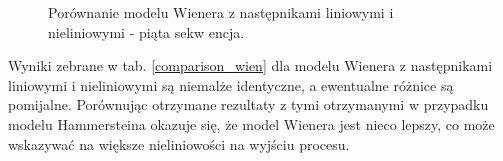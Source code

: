 \begin{figure}[p]
\centering
{}
\vspace{0.5cm}
\caption{Porównanie modelu Wienera z następnikami liniowymi i nieliniowymi - piąta sekw encja.}
\label{last_wien}
\end{figure}

\newpage

Wyniki zebrane w tab. \ref{comparison_wien} dla modelu Wienera z następnikami liniowymi i nieliniowymi są niemalże identyczne, a ewentualne różnice są pomijalne. Porównując otrzymane rezultaty z tymi otrzymanymi w przypadku modelu Hammersteina okazuje się, że model Wienera jest nieco lepszy, co może wskazywać na większe nieliniowości na wyjściu procesu.
 
